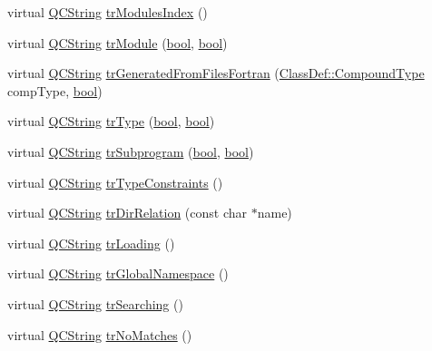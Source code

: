 \begin{DoxyCompactItemize}
virtual \hyperlink{class_q_c_string}{Q\+C\+String} \hyperlink{class_translator_chinese_a87ceeb90f60f6a22b0f75310036c49bc}{tr\+Modules\+Index} ()
\item 
virtual \hyperlink{class_q_c_string}{Q\+C\+String} \hyperlink{class_translator_chinese_a07ee2974f4e86f9aab164b798e21d153}{tr\+Module} (\hyperlink{qglobal_8h_a1062901a7428fdd9c7f180f5e01ea056}{bool}, \hyperlink{qglobal_8h_a1062901a7428fdd9c7f180f5e01ea056}{bool})
\item 
virtual \hyperlink{class_q_c_string}{Q\+C\+String} \hyperlink{class_translator_chinese_a876cf8b6a040eaeb0bb4be19151087c5}{tr\+Generated\+From\+Files\+Fortran} (\hyperlink{class_class_def_ae70cf86d35fe954a94c566fbcfc87939}{Class\+Def\+::\+Compound\+Type} comp\+Type, \hyperlink{qglobal_8h_a1062901a7428fdd9c7f180f5e01ea056}{bool})
\item 
virtual \hyperlink{class_q_c_string}{Q\+C\+String} \hyperlink{class_translator_chinese_ab9ac4259fdcf8844575dbd2b14d3dfd7}{tr\+Type} (\hyperlink{qglobal_8h_a1062901a7428fdd9c7f180f5e01ea056}{bool}, \hyperlink{qglobal_8h_a1062901a7428fdd9c7f180f5e01ea056}{bool})
\item 
virtual \hyperlink{class_q_c_string}{Q\+C\+String} \hyperlink{class_translator_chinese_a0ad7d991fbd21f55b25b4d9d57896da0}{tr\+Subprogram} (\hyperlink{qglobal_8h_a1062901a7428fdd9c7f180f5e01ea056}{bool}, \hyperlink{qglobal_8h_a1062901a7428fdd9c7f180f5e01ea056}{bool})
\item 
virtual \hyperlink{class_q_c_string}{Q\+C\+String} \hyperlink{class_translator_chinese_a3fae3e9b8d961fff3b85130f84ef4445}{tr\+Type\+Constraints} ()
\item 
virtual \hyperlink{class_q_c_string}{Q\+C\+String} \hyperlink{class_translator_chinese_a2a08afc3831eec855fd270c0612654d5}{tr\+Dir\+Relation} (const char $\ast$name)
\item 
virtual \hyperlink{class_q_c_string}{Q\+C\+String} \hyperlink{class_translator_chinese_a3cce85a8c735d1c66b14b1999d196117}{tr\+Loading} ()
\item 
virtual \hyperlink{class_q_c_string}{Q\+C\+String} \hyperlink{class_translator_chinese_afe5ad317f28188e857a13deea536a4f2}{tr\+Global\+Namespace} ()
\item 
virtual \hyperlink{class_q_c_string}{Q\+C\+String} \hyperlink{class_translator_chinese_a7f82dba97220eca352c25cc746828124}{tr\+Searching} ()
\item 
virtual \hyperlink{class_q_c_string}{Q\+C\+String} \hyperlink{class_translator_chinese_af85df82328f721da14c8fea121ae8310}{tr\+No\+Matches} ()

\end{DoxyCompactItemize}
